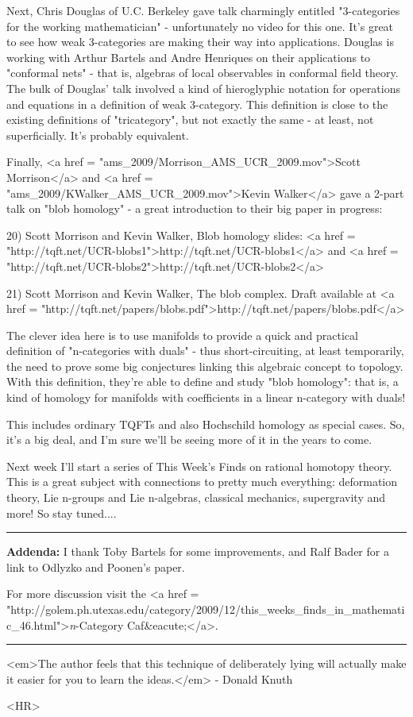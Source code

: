 Next, Chris Douglas of U.C. Berkeley gave talk charmingly entitled
"3-categories for the working mathematician" - 
unfortunately no video for this one.  It's great to see how weak
3-categories are making their way into applications.  Douglas is
working with Arthur Bartels and Andre Henriques on their applications
to "conformal nets" - that is, algebras of local observables
in conformal field theory.  The bulk of Douglas' talk involved a kind
of hieroglyphic notation for operations and equations in a definition
of weak 3-category.  This definition is close to the existing
definitions of "tricategory", but not exactly the same - at
least, not superficially.  It's probably equivalent.

Finally, <a href = "ams_2009/Morrison_AMS_UCR_2009.mov">Scott
Morrison</a> and <a href =
"ams_2009/KWalker_AMS_UCR_2009.mov">Kevin Walker</a> gave a
2-part talk on "blob homology" - a great introduction to
their big paper in progress:

20) Scott Morrison and Kevin Walker, Blob homology slides:
<a href = "http://tqft.net/UCR-blobs1">http://tqft.net/UCR-blobs1</a>
and 
<a href = "http://tqft.net/UCR-blobs2">http://tqft.net/UCR-blobs2</a>

21) Scott Morrison and Kevin Walker, The blob complex.  Draft
available at <a href = "http://tqft.net/papers/blobs.pdf">http://tqft.net/papers/blobs.pdf</a>

The clever idea here is to use manifolds to provide a quick and
practical definition of "n-categories with duals" - thus
short-circuiting, at least temporarily, the need to prove some big
conjectures linking this algebraic concept to topology.  With this
definition, they're able to define and study "blob
homology": that is, a kind of homology for manifolds with
coefficients in a linear n-category with duals!

This includes ordinary TQFTs and also Hochschild homology as special
cases.  So, it's a big deal, and I'm sure we'll be seeing more of it
in the years to come.

Next week I'll start a series of This Week's Finds on rational
homotopy theory.  This is a great subject with connections to 
pretty much everything: deformation theory, Lie n-groups and Lie
n-algebras, classical mechanics, supergravity and more!  So stay
tuned....

\par\noindent\rule{\textwidth}{0.4pt}
\textbf{Addenda:} I thank Toby Bartels for some improvements, and
Ralf Bader for a link to Odlyzko and Poonen's paper.

For more discussion visit the <a href =
"http://golem.ph.utexas.edu/category/2009/12/this_weeks_finds_in_mathematic_46.html">\emph{n}-Category
Caf&eacute;</a>.

\par\noindent\rule{\textwidth}{0.4pt}
<em>The author feels that this technique of deliberately lying will
actually make it easier for you to learn the ideas.</em> - Donald Knuth

<HR>



